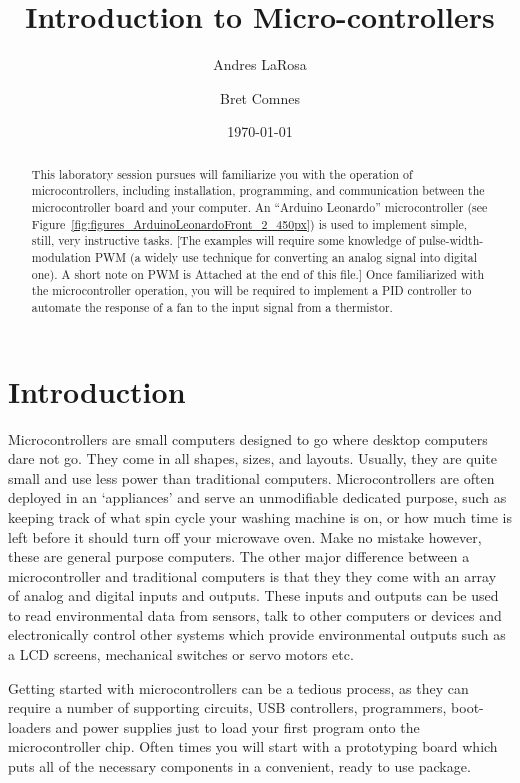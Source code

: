 \documentclass[11pt,a4paper]{article}
\begin{document}
\title{Introduction to Micro-controllers}
\date{\today} 
\author{Andres LaRosa}
\author{Bret Comnes}
\maketitle

\begin{abstract}
This laboratory session pursues will familiarize you with the operation of microcontrollers, including installation, programming, and communication between the microcontroller board and your computer. An “Arduino Leonardo” microcontroller (see Figure~\ref{fig:figures_ArduinoLeonardoFront_2_450px}) is used to implement simple, still, very instructive tasks. [The examples will require some knowledge of pulse-width-modulation PWM (a widely use technique for converting an analog signal into digital one). A short note on PWM is Attached at the end of this file.] Once familiarized with the microcontroller operation, you will be required to implement a PID controller to automate the response of a fan to the input signal from a thermistor.
\end{abstract}

\section{Introduction} %
\label{sec:introduction}

Microcontrollers are small computers designed to go where desktop computers dare not go.  They come in all shapes, sizes, and layouts.  Usually, they are quite small and use less power than traditional computers.  Microcontrollers are often deployed in an `appliances' and serve an unmodifiable dedicated purpose, such as keeping track of what spin cycle your washing machine is on, or how much time is left before it should turn off your microwave oven.  Make no mistake however, these are general purpose computers.  The other major difference between a microcontroller and traditional computers is that they they come with an array of analog and digital inputs and outputs. These inputs and outputs can be used to read environmental data from sensors, talk to other computers or devices and electronically control other systems which provide environmental outputs such as a LCD screens, mechanical switches or servo motors etc.  \cite{wpmicro}

Getting started with microcontrollers can be a tedious process, as they can require a number of supporting circuits, USB controllers, programmers, boot-loaders and power supplies just to load your first program onto the microcontroller chip.  Often times you will start with a prototyping board which puts all of the necessary components in a convenient, ready to use package.
\end{document}

